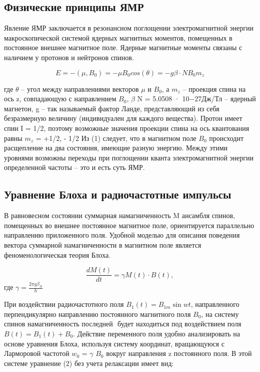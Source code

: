 \documentclass{article}
\begin{document}
\subsection{Физические принципы ЯМР}
\item Явление ЯМР заключается в резонансном поглощении электромагнитной энергии макроскопической системой ядерных магнитных моментов, помещенных в постоянное внешнее магнитное 
поле. Ядерные магнитные моменты связаны с наличием у протонов и нейтронов спинов.

\begin{equation*}
    E = - (\mu,B_0) = −\mu B_0cos(\theta) = −g\beta\cdot NB_0m_z 
\end{equation*}

где $\theta$ – угол между направлениями векторов $\mu$ и $B_0$, а $m_z$ – проекция спина на ось z, совпадающую с направлением $B_0$, $\beta$ N  = 5.0508 · 10−27Дж/Тл – ядерный магнетон, g – так называемый фактор Ланде, представляющий из себя безразмерную величину (индивидуален для каждого вещества). Протон имеет спин I = 1/2, поэтому возможные значения проекции спина на ось квантования равны $m_z$ = +1/2, - 1/2 
Из (1) следует, что в магнитном поле $B_0$ происходит расщепление на два состояния, имеющие разную энергию. Между этими уровнями возможны переходы при поглощении кванта электромагнитной энергии определенной частоты – это и есть суть ЯМР. 

\subsection{Уравнение Блоха и радиочастотные импульсы}
\item В равновесном состоянии суммарная намагниченность M ансамбля спинов, помещенных во внешнее постоянное магнитное поле, ориентируется параллельно направлению приложенного поля. Удобной моделью для описания поведения вектора суммарной намагниченности в магнитном поле является феноменологическая теория Блоха.

\begin{equation*}
    \frac{dM(t)}{dt} = \gamma M(t)\cdot B(t),
    
\end{equation*}
где $\gamma = \frac{2\pi g \beta_{N}}{h}$

При воздействии радиочастотного поля $B_1(t) = B_{1m}\sin{wt}$, направленного перпендикулярно
направлению постоянного магнитного поля $B_0$, на систему спинов намагниченность последней ⃗⃗⃗
будет находиться под воздействием поля $B(t) = B_1(t) + B_0 $. Действие переменного поля удобно анализировать на основе уравнения Блоха, используя систему координат, вращающуюся с Ларморовой частотой $w_0$ = $\gamma$ $B_0$ вокруг направления z постоянного поля. В этой системе уравнение (2) без учета релаксации имеет вид:
\end{document}
